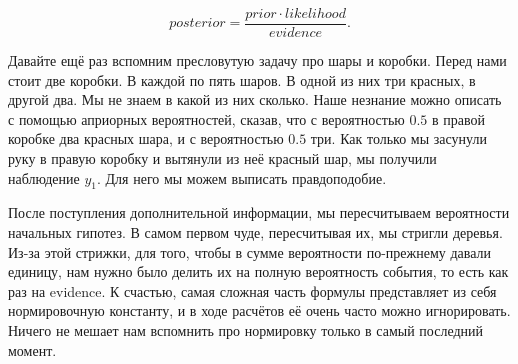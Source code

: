 \documentclass[12pt, a4paper, oneside]{article}
\begin{document}
\[ 
posterior = \frac{prior \cdot likelihood}{evidence}.
\]

Давайте ещё раз вспомним пресловутую задачу про шары и коробки.  Перед нами стоит две коробки. В каждой по пять шаров. В одной из них три красных, в другой два. Мы не знаем в какой из них сколько. Наше незнание можно описать с помощью априорных вероятностей, сказав, что с вероятностью $0.5$ в правой коробке два красных шара, и с вероятностью $0.5$ три.  Как только мы засунули руку в правую коробку и вытянули из неё красный шар, мы получили наблюдение $y_1$. Для него мы можем выписать правдоподобие. 

После поступления дополнительной информации, мы пересчитываем вероятности начальных гипотез. В самом первом чуде, пересчитывая их, мы стригли деревья. Из-за этой стрижки, для того, чтобы в сумме вероятности по-прежнему давали единицу, нам нужно было делить их на полную вероятность события, то есть как раз на evidence. К счастью, самая сложная часть формулы представляет из себя нормировочную константу, и в ходе расчётов её очень часто можно игнорировать. Ничего не мешает нам вспомнить про нормировку только в самый последний момент.

\end{document}
